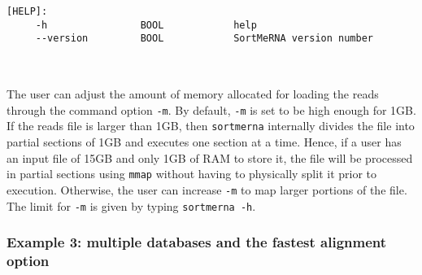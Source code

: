 \documentclass[10pt,a4paper]{article}
\begin{document}
\begin{Verbatim}[fontsize=\footnotesize]
   [HELP]:
     -h                BOOL            help
     --version         BOOL            SortMeRNA version number


\end{Verbatim}

~\\
\noindent The user can adjust the amount of memory allocated for loading the reads through the 
command option \texttt{-m}. By default, \texttt{-m} is set to be high enough for 1GB.
If the reads file is larger than 1GB, then \texttt{sortmerna} internally divides the file into partial sections of 
1GB and executes one section at a time. Hence, if a user has an input file of 15GB and only 1GB of RAM to store it, the 
file will be processed in partial sections using \texttt{mmap} without having to physically split it prior to execution. Otherwise, the user
can increase \texttt{-m} to map larger portions of the file. The limit for \texttt{-m} is given by typing \texttt{sortmerna -h}.


\newpage
 
\subsubsection{Example 3: multiple databases and the fastest alignment option}
\end{document}
